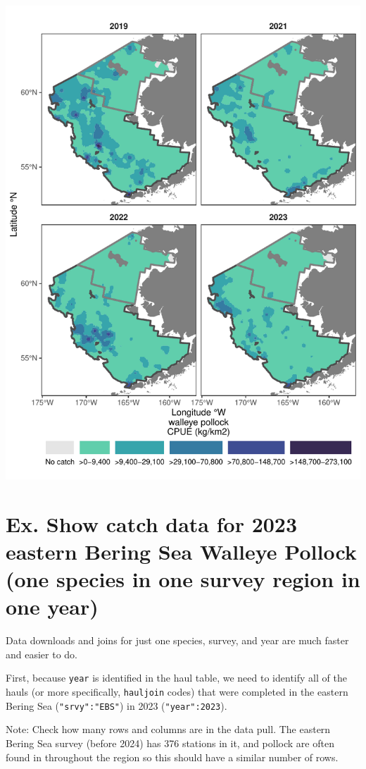 \documentclass[
  letterpaper,
  oneside,
  open=any]{scrbook}
\begin{document}
\includegraphics{content/foss-api-r_files/figure-pdf/pollock-multi-idw-1.pdf}

\section{Ex. Show catch data for 2023 eastern Bering Sea Walleye Pollock
(one species in one survey region in one
year)}\label{ex.-show-catch-data-for-2023-eastern-bering-sea-walleye-pollock-one-species-in-one-survey-region-in-one-year}

Data downloads and joins for just one species, survey, and year are much
faster and easier to do.

First, because \texttt{year} is identified in the haul table, we need to
identify all of the hauls (or more specifically, \texttt{hauljoin}
codes) that were completed in the eastern Bering Sea
(\texttt{"srvy":"EBS"}) in 2023 (\texttt{"year":2023}).

Note: Check how many rows and columns are in the data pull. The eastern
Bering Sea survey (before 2024) has 376 stations in it, and pollock are
often found in throughout the region so this should have a similar
number of rows.
\end{document}
